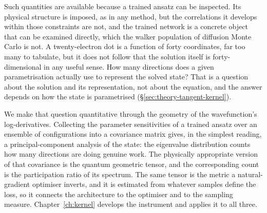 Such quantities are available because a trained ansatz can be inspected. Its physical structure is
imposed, as in any method, but the correlations it develops within those constraints are
not, and the trained network is a concrete object that can be examined directly, which the
walker population of diffusion Monte Carlo is not. A twenty-electron dot is a function of forty coordinates, far too
many to tabulate, but it does not follow that the solution itself is forty-dimensional in
any useful sense. How many directions does a given
parametrisation actually use to represent the solved state? That is a question about the
solution and its representation, not about the equation, and the answer depends on how the
state is parametrised (\S\ref{sec:theory-tangent-kernel}).

We make that question quantitative through the geometry of the wavefunction's
log-derivatives. Collecting the parameter sensitivities of a trained ansatz over an
ensemble of configurations into a covariance matrix gives, in the simplest reading, a
principal-component analysis of the state: the eigenvalue distribution counts how many
directions are doing genuine work. The physically appropriate version of that covariance
is the quantum geometric tensor, and the corresponding count is the participation ratio of
its spectrum. The same tensor is the metric a natural-gradient optimiser inverts, and it is
estimated from whatever samples define the loss, so it connects the architecture to the
optimiser and to the sampling measure. Chapter~\ref{ch:kernel} develops the instrument and
applies it to all three.


